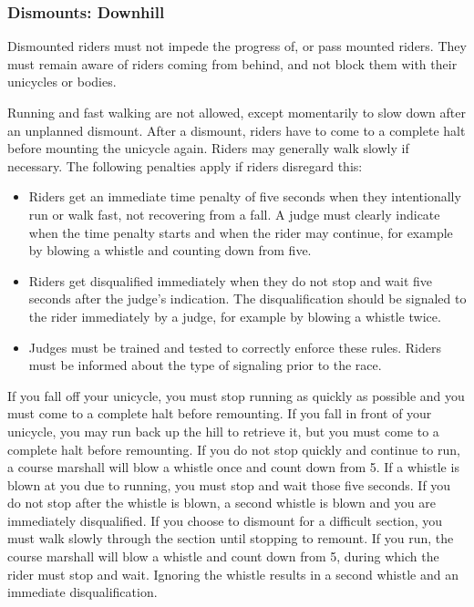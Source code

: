 \subsubsection{Dismounts: Downhill}%

Dismounted riders must not impede the progress of, or pass mounted riders.
They must remain aware of riders coming from behind, and not block them with their
unicycles or bodies.

Running and fast walking are not allowed, except momentarily to slow down after an unplanned dismount.
After a dismount, riders have to come to a complete halt before mounting the unicycle again.
Riders may generally walk slowly if necessary.
The following penalties apply if riders disregard this:
\begin{itemize}
\item Riders get an immediate time penalty of five seconds when they intentionally run or walk fast, not recovering from a fall.
A judge must clearly indicate when the time penalty starts and when the rider may continue, for example by blowing a whistle and counting down from five.
\item Riders get disqualified immediately when they do not stop and wait five seconds after the judge's indication.
The disqualification should be signaled to the rider immediately by a judge, for example by blowing a whistle twice.
\item Judges must be trained and tested to correctly enforce these rules.
Riders must be informed about the type of signaling prior to the race.
\end{itemize}

If you fall off your unicycle, you must stop running as quickly as possible and you
must come to a complete halt before remounting. If you fall in front of your unicycle,
you may run back up the hill to retrieve it, but you must come to a complete halt
before remounting.
If you do not stop quickly and continue to run, a course marshall will blow a whistle
once and count down from 5. If a whistle is blown at you due to running, you must
stop and wait those five seconds.
If you do not stop after the whistle is blown, a second whistle is blown and you are
immediately disqualified.
If you choose to dismount for a difficult section, you must walk slowly through the
section until stopping to remount. If you run, the course marshall will blow a whistle
and count down from 5, during which the rider must stop and wait. Ignoring the
whistle results in a second whistle and an immediate disqualification.

